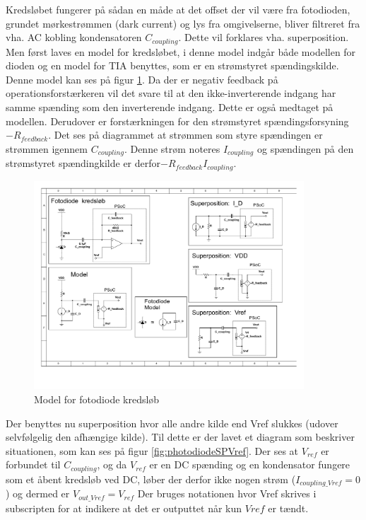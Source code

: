 \documentclass[HardwareDesign/HardwareDesign_main.tex]{subfiles}
\begin{document}
Kredsløbet fungerer på sådan en måde at det offset der vil være fra fotodioden, grundet mørkestrømmen (dark current) og lys fra omgivelserne, bliver filtreret fra vha. AC kobling kondensatoren $C_{coupling}$. Dette vil forklares vha. superposition. Men først laves en model for kredsløbet, i denne model indgår både modellen for dioden og en model for TIA benyttes, som er en strømstyret spændingskilde. Denne model kan ses på figur \ref{fig:photodiodeCircuitModel}. 
Da der er negativ feedback på operationsforstærkeren vil det svare til at den ikke-inverterende indgang har samme spænding som den inverterende indgang. Dette er også medtaget på modellen. Derudover er forstærkningen for den strømstyret spændingsforsyning $-R_{feedback}$. Det ses på diagrammet at strømmen som styre spændingen er strømmen igennem $C_{coupling}$. Denne strøm noteres $I_{coupling}$ og spændingen på den strømstyret spændingkilde er derfor$-R_{feedback} I_{coupling}$.

\begin{figure}[H]
    \centering
    \includegraphics[width=0.9\textwidth,trim={0.6in 2.4in 7in 3.5in},clip, page=1]{HardwareDesign/CupSensor/graphics/Superposition.pdf}
    \caption{Model for fotodiode kredsløb}
    \label{fig:photodiodeCircuitModel}
\end{figure}

Der benyttes nu superposition hvor alle andre kilde end Vref slukkes (udover selvfølgelig den afhængige kilde). Til dette er der lavet et diagram som beskriver situationen, som kan ses på figur \ref{fig:photodiodeSPVref}. Der ses at $V_{ref}$ er forbundet til $C_{coupling}$, og da $V_{ref}$ er en DC spænding og en kondensator fungere som et åbent kredsløb ved DC, løber der derfor ikke nogen strøm ($I_{coupling\_Vref}=0$) og dermed er $V_{out\_Vref}=V_{ref}$ Der bruges notationen hvor Vref skrives i subscripten for at indikere at det er outputtet når kun $Vref$ er tændt.
\end{document}
